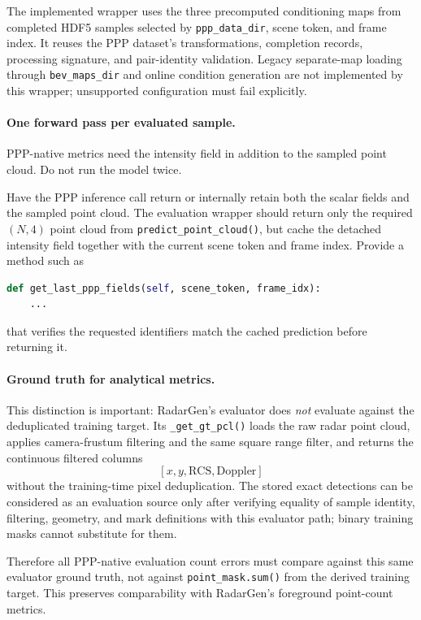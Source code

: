 \documentclass[11pt,a4paper]{article}
\begin{document}
The implemented wrapper uses the three precomputed conditioning maps
from completed HDF5 samples selected by \texttt{ppp\_data\_dir}, scene
token, and frame index. It reuses the PPP dataset's transformations,
completion records, processing signature, and pair-identity validation.
Legacy separate-map loading through \texttt{bev\_maps\_dir} and online
condition generation are not implemented by this wrapper; unsupported
configuration must fail explicitly.

\paragraph{One forward pass per evaluated sample.}
PPP-native metrics need the intensity field in addition to the sampled point cloud. Do not run the model twice.

Have the PPP inference call return or internally retain both the scalar fields and the sampled point cloud. The evaluation wrapper should return only the required \((N,4)\) point cloud from \texttt{predict\_point\_cloud()}, but cache the detached intensity field together with the current scene token and frame index. Provide a method such as
\begin{lstlisting}[language=Python]
def get_last_ppp_fields(self, scene_token, frame_idx):
    ...
\end{lstlisting}
that verifies the requested identifiers match the cached prediction before returning it.

\paragraph{Ground truth for analytical metrics.}
This distinction is important: RadarGen's evaluator does \emph{not} evaluate against the deduplicated training target. Its \texttt{\_get\_gt\_pcl()} loads the raw radar point cloud, applies camera-frustum filtering and the same square range filter, and returns the continuous filtered columns
\[
    [x,y,\mathrm{RCS},\mathrm{Doppler}]
\]
without the training-time pixel deduplication. The stored exact detections can be considered as an evaluation source only after verifying equality of sample identity, filtering, geometry, and mark definitions with this evaluator path; binary training masks cannot substitute for them.

Therefore all PPP-native evaluation count errors must compare against this same evaluator ground truth, not against \texttt{point\_mask.sum()} from the derived training target. This preserves comparability with RadarGen's foreground point-count metrics.
\end{document}
